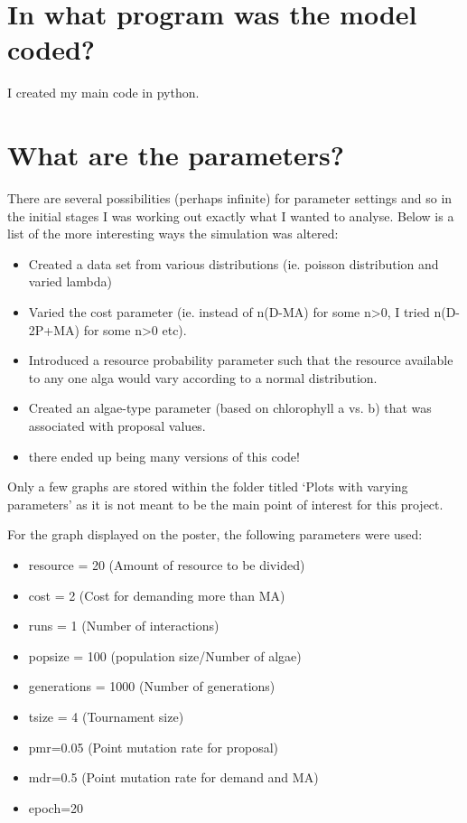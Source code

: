\documentclass[]{article}
\begin{document}
\section{In what program was the model
coded?}\label{in-what-program-was-the-model-coded}

I created my main code in python.

\section{What are the parameters?}\label{what-are-the-parameters}

There are several possibilities (perhaps infinite) for parameter
settings and so in the initial stages I was working out exactly what I
wanted to analyse. Below is a list of the more interesting ways the
simulation was altered:

\begin{itemize}
    \item Created a data set from various distributions (ie. poisson distribution and varied lambda)
    \item Varied the cost parameter (ie. instead of n(D-MA) for some n>0, I tried n(D-2P+MA) for some n>0 etc).
    \item Introduced a resource probability parameter such that the resource available to any one alga would vary according to a normal distribution.
    \item Created an algae-type parameter (based on chlorophyll a vs. b) that was associated with proposal values.  
    \item there ended up being many versions of this code! 
\end{itemize}

Only a few graphs are stored within the folder titled `Plots with
varying parameters' as it is not meant to be the main point of interest
for this project.

For the graph displayed on the poster, the following parameters were
used:

\begin{itemize}
  \item resource = 20           (Amount of resource to be divided)
  \item cost = 2              (Cost for demanding more than MA)
  \item runs = 1                (Number of interactions)
  \item popsize = 100          (population size/Number of algae)
  \item generations = 1000       (Number of generations)
  \item tsize = 4              (Tournament size)
  \item pmr=0.05            (Point mutation rate for proposal)
  \item mdr=0.5             (Point mutation rate for demand and MA)
  \item epoch=20
\end{itemize}
\end{document}
